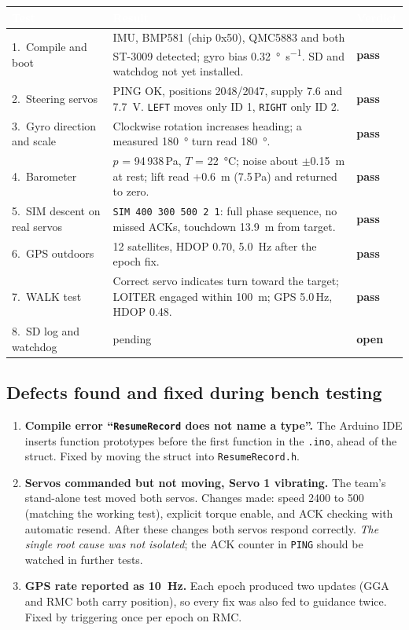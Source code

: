 \documentclass[11pt,a4paper]{article}
\newcommand{\good}[1]{\textcolor{goodgreen}{\textbf{#1}}}
\newcommand{\warn}[1]{\textcolor{warnamber}{\textbf{#1}}}
\newcommand{\hdr}[1]{\textcolor{white}{\textbf{#1}}}
\newcommand{\code}[1]{\texttt{#1}}
\begin{document}
\begin{center}
\small
\renewcommand{\arraystretch}{1.22}
\begin{tabularx}{\linewidth}{p{2.6cm}Yp{1.6cm}}
\toprule
{}\hdr{Test} & \hdr{Result} & \hdr{Verdict} \\
.\ Compile and boot & IMU, BMP581 (chip 0x50), QMC5883 and both ST-3009 detected; gyro bias \SI{0.32}{\degree\per\second}. SD and watchdog not yet installed. & \good{pass} \\
2.\ Steering servos & PING OK, positions 2048/2047, supply 7.6 and \SI{7.7}{\volt}. \code{LEFT} moves only ID 1, \code{RIGHT} only ID 2. & \good{pass} \\
3.\ Gyro direction and scale & Clockwise rotation increases heading; a measured \SI{180}{\degree} turn read \SI{180}{\degree}. & \good{pass} \\
4.\ Barometer & $p$ = 94\,938\,Pa, $T$ = \SI{22}{\celsius}; noise about $\pm$\SI{0.15}{\meter} at rest; lift read +\SI{0.6}{\meter} (7.5\,Pa) and returned to zero. & \good{pass} \\
5.\ SIM descent on real servos & \code{SIM 400 300 500 2 1}: full phase sequence, no missed ACKs, touchdown \SI{13.9}{\meter} from target. & \good{pass} \\
6.\ GPS outdoors & 12 satellites, HDOP 0.70, \SI{5.0}{\hertz} after the epoch fix. & \good{pass} \\
7.\ WALK test & Correct servo indicates turn toward the target; LOITER engaged within \SI{100}{\meter}; GPS 5.0\,Hz, HDOP 0.48. & \good{pass} \\
8.\ SD log and watchdog & pending & \warn{open} \\
\bottomrule
\end{tabularx}
\end{center}

\subsection{Defects found and fixed during bench testing}
\begin{enumerate}
  \item \textbf{Compile error ``\code{ResumeRecord} does not name a type''.}
        The Arduino IDE inserts function prototypes before the first function
        in the \code{.ino}, ahead of the struct. Fixed by moving the struct
        into \code{ResumeRecord.h}.
  \item \textbf{Servos commanded but not moving, Servo 1 vibrating.} The team's
        stand-alone test moved both servos. Changes made: speed 2400 to 500
        (matching the working test), explicit torque enable, and ACK checking
        with automatic resend. After these changes both servos respond
        correctly. \emph{The single root cause was not isolated}; the ACK
        counter in \code{PING} should be watched in further tests.
  \item \textbf{GPS rate reported as \SI{10}{\hertz}.} Each epoch produced two
        updates (GGA and RMC both carry position), so every fix was also fed
        to guidance twice. Fixed by triggering once per epoch on RMC.
\end{enumerate}
\end{document}
